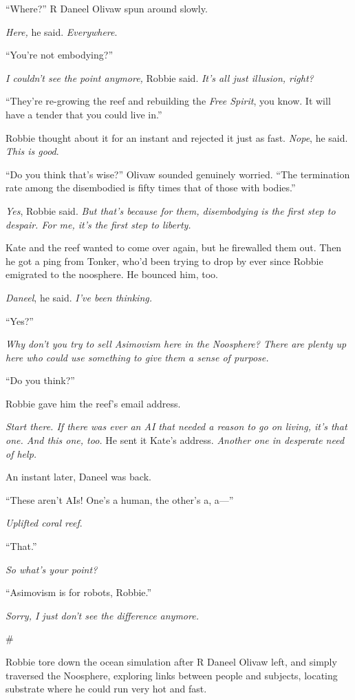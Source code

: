 “Where?” R Daneel Olivaw spun around slowly.

\emph{Here,} he said. \emph{Everywhere}.

“You’re not embodying?”

\emph{I couldn’t see the point anymore,} Robbie said.
\emph{It’s all just illusion, right?}

“They’re re-growing the reef and rebuilding the \emph{Free Spirit},
you know. It will have a tender that you could live in.”

Robbie thought about it for an instant and rejected it just as
fast. \emph{Nope}, he said. \emph{This is good}.

“Do you think that’s wise?” Olivaw sounded genuinely worried. “The
termination rate among the disembodied is fifty times that of those
with bodies.”

\emph{Yes}, Robbie said.
\emph{But that’s because for them, disembodying is the first step to despair. For me, it’s the first step to liberty.}

Kate and the reef wanted to come over again, but he firewalled them
out. Then he got a ping from Tonker, who’d been trying to drop by
ever since Robbie emigrated to the noosphere. He bounced him, too.

\emph{Daneel}, he said. \emph{I’ve been thinking.}

“Yes?”

\emph{Why don’t you try to sell Asimovism here in the Noosphere? There are plenty up here who could use something to give them a sense of purpose.}

“Do you think?”

Robbie gave him the reef’s email address.

\emph{Start there. If there was ever an AI that needed a reason to go on living, it’s that one. And this one, too.}
He sent it Kate’s address.
\emph{Another one in desperate need of help.}

An instant later, Daneel was back.

“These aren’t AIs! One’s a human, the other’s a, a—”

\emph{Uplifted coral reef}.

“That.”

\emph{So what’s your point?}

“Asimovism is for robots, Robbie.”

\emph{Sorry, I just don’t see the difference anymore.}

\#

Robbie tore down the ocean simulation after R Daneel Olivaw left,
and simply traversed the Noosphere, exploring links between people
and subjects, locating substrate where he could run very hot and
fast.

